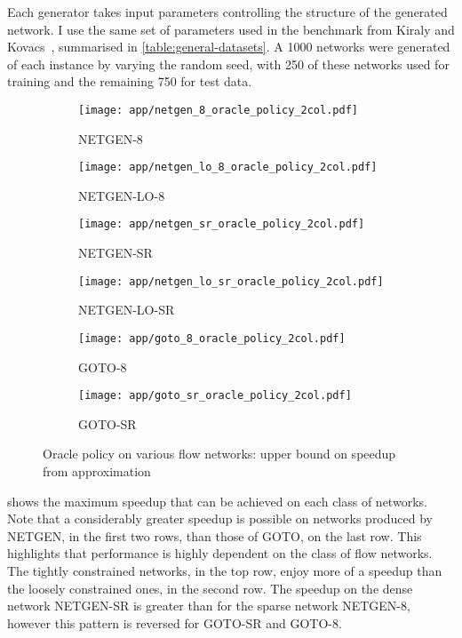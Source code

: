 Each generator takes input parameters controlling the structure of the generated network. I use the same set of parameters used in the benchmark from Kiraly and Kovacs~\cite{KiralyKovacs:2012}, summarised in \cref{table:general-datasets}. A 1000 networks were generated of each instance by varying the random seed, with 250 of these networks used for training and the remaining 750 for test data.

\begin{figure}
    \begin{widepage}
    \begin{subfigure}[c]{0.5\textwidth}
        \texttt{[image: app/netgen\_8\_oracle\_policy\_2col.pdf]}
        \caption{NETGEN-8}
    \end{subfigure}
    \begin{subfigure}[c]{0.5\textwidth}
        \texttt{[image: app/netgen\_lo\_8\_oracle\_policy\_2col.pdf]}
        \caption{NETGEN-LO-8}
    \end{subfigure}
    \begin{subfigure}[c]{0.5\textwidth}
        \texttt{[image: app/netgen\_sr\_oracle\_policy\_2col.pdf]}
        \caption{NETGEN-SR}
    \end{subfigure}
    \begin{subfigure}[c]{0.5\textwidth}
        \texttt{[image: app/netgen\_lo\_sr\_oracle\_policy\_2col.pdf]}
        \caption{NETGEN-LO-SR}
    \end{subfigure}
    \begin{subfigure}[c]{0.5\textwidth}
        \texttt{[image: app/goto\_8\_oracle\_policy\_2col.pdf]}
        \caption{GOTO-8}
    \end{subfigure}
    \begin{subfigure}[c]{0.5\textwidth}
        \texttt{[image: app/goto\_sr\_oracle\_policy\_2col.pdf]}
        \caption{GOTO-SR}
    \end{subfigure}
    \end{widepage}
    \caption{Oracle policy on various flow networks: upper bound on speedup from approximation}
    \label{fig:app-general-oracle-policy}
\end{figure}

 shows the maximum speedup that can be achieved on each class of networks. Note that a considerably greater speedup is possible on networks produced by NETGEN, in the first two rows, than those of GOTO, on the last row. This highlights that performance is highly dependent on the class of flow networks. The tightly constrained networks, in the top row, enjoy more of a speedup than the loosely constrained ones, in the second row. The speedup on the dense network NETGEN-SR is greater than for the sparse network NETGEN-8, however this pattern is reversed for GOTO-SR and GOTO-8.

